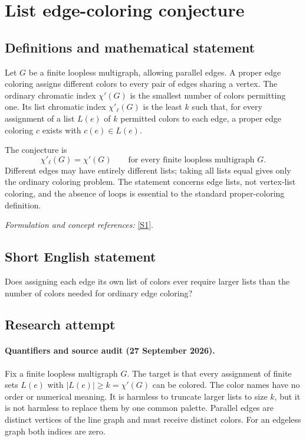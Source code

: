 \documentclass[11pt]{article}
\begin{document}
\section*{\texorpdfstring{List edge-coloring conjecture}{List edge-coloring conjecture}}\label{30006988}
\subsection{Definitions and mathematical statement}
Let $G$ be a finite loopless multigraph, allowing parallel edges. A proper edge coloring assigns different colors to every pair of edges sharing a vertex. The ordinary chromatic index $\chi'(G)$ is the smallest number of colors permitting one. Its list chromatic index $\chi'_\ell(G)$ is the least $k$ such that, for every assignment of a list $L(e)$ of $k$ permitted colors to each edge, a proper edge coloring $c$ exists with $c(e)\in L(e)$.

The conjecture is
\[
 \chi'_\ell(G)=\chi'(G)\qquad\text{for every finite loopless multigraph }G.
\]
Different edges may have entirely different lists; taking all lists equal gives only the ordinary coloring problem. The statement concerns edge lists, not vertex-list coloring, and the absence of loops is essential to the standard proper-coloring definition.
\par\smallskip\textit{Formulation and concept references:} \href{https://www.sciencedirect.com/science/article/pii/S0012365X25000287}{[S1]}.

\subsection{Short English statement}
Does assigning each edge its own list of colors ever require larger lists than the number of colors needed for ordinary edge coloring?
\subsection{Research attempt}

\paragraph{Quantifiers and source audit (27 September 2026).}
Fix a finite loopless multigraph $G$. The target is that every assignment of
finite sets $L(e)$ with $|L(e)|\geq k=\chi'(G)$ can be colored. The color
names have no order or numerical meaning. It is harmless to truncate larger
lists to size $k$, but it is not harmless to replace them by one common
palette. Parallel edges are distinct vertices of the line graph and must
receive distinct colors. For an edgeless graph both indices are zero.
\end{document}
